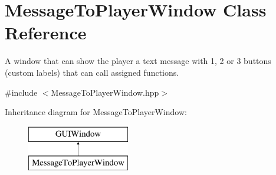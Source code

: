 \hypertarget{class_message_to_player_window}{}\section{Message\+To\+Player\+Window Class Reference}
\label{class_message_to_player_window}


A window that can show the player a text message with 1, 2 or 3 buttons (custom labels) that can call assigned functions.  




{\ttfamily \#include $<$Message\+To\+Player\+Window.\+hpp$>$}

Inheritance diagram for Message\+To\+Player\+Window\+:\begin{figure}[H]
\begin{center}
\leavevmode
\includegraphics[height=2.000000cm]{class_message_to_player_window}
\end{center}
\end{figure}
